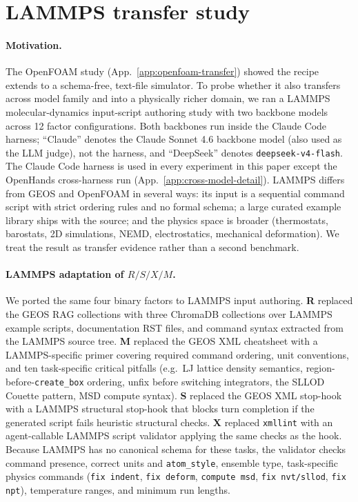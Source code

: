\documentclass{article}
\begin{document}
\section{LAMMPS transfer study}
\label{app:lammps-transfer}

\paragraph{Motivation.}
The OpenFOAM study (App.~\ref{app:openfoam-transfer}) showed the recipe extends to a schema-free, text-file simulator. To probe whether it also transfers across model family and into a physically richer domain, we ran a LAMMPS molecular-dynamics input-script authoring study with two backbone models across 12 factor configurations. Both backbones run inside the Claude Code harness; ``Claude'' denotes the Claude Sonnet 4.6 backbone model (also used as the LLM judge), not the harness, and ``DeepSeek'' denotes \texttt{deepseek-v4-flash}. The Claude Code harness is used in every experiment in this paper except the OpenHands cross-harness run (App.~\ref{app:cross-model-detail}). LAMMPS differs from GEOS and OpenFOAM in several ways: its input is a sequential command script with strict ordering rules and no formal schema; a large curated example library ships with the source; and the physics space is broader (thermostats, barostats, 2D simulations, NEMD, electrostatics, mechanical deformation). We treat the result as transfer evidence rather than a second benchmark.

\paragraph{LAMMPS adaptation of \texorpdfstring{$R/S/X/M$}{R/S/X/M}.}
We ported the same four binary factors to LAMMPS input authoring. \textbf{R} replaced the GEOS RAG collections with three ChromaDB collections over LAMMPS example scripts, documentation RST files, and command syntax extracted from the LAMMPS source tree. \textbf{M} replaced the GEOS XML cheatsheet with a LAMMPS-specific primer covering required command ordering, unit conventions, and ten task-specific critical pitfalls (e.g.\ LJ lattice density semantics, region-before-\texttt{create\_box} ordering, unfix before switching integrators, the SLLOD Couette pattern, MSD compute syntax). \textbf{S} replaced the GEOS XML stop-hook with a LAMMPS structural stop-hook that blocks turn completion if the generated script fails heuristic structural checks. \textbf{X} replaced \texttt{xmllint} with an agent-callable LAMMPS script validator applying the same checks as the hook. Because LAMMPS has no canonical schema for these tasks, the validator checks command presence, correct units and \texttt{atom\_style}, ensemble type, task-specific physics commands (\texttt{fix indent}, \texttt{fix deform}, \texttt{compute msd}, \texttt{fix nvt/sllod}, \texttt{fix npt}), temperature ranges, and minimum run lengths.
\end{document}
